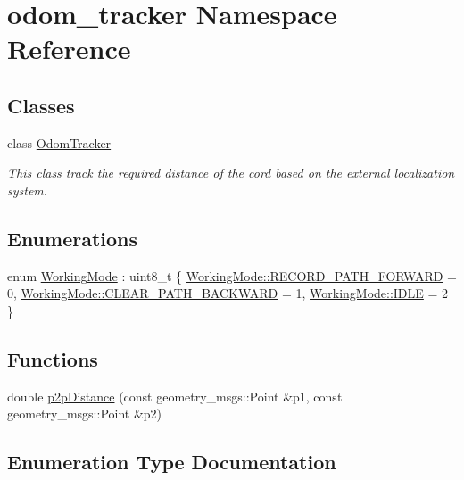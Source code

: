 \hypertarget{namespaceodom__tracker}{}\section{odom\+\_\+tracker Namespace Reference}
\label{namespaceodom__tracker}
\subsection*{Classes}
\begin{DoxyCompactItemize}
\item 
class \hyperlink{classodom__tracker_1_1OdomTracker}{Odom\+Tracker}
\begin{DoxyCompactList}\small\item\em This class track the required distance of the cord based on the external localization system. \end{DoxyCompactList}\end{DoxyCompactItemize}
\subsection*{Enumerations}
\begin{DoxyCompactItemize}
\item 
enum \hyperlink{namespaceodom__tracker_a4daf27fd157b1a481fdfd6f90de00b88}{Working\+Mode} \+: uint8\+\_\+t \{ \hyperlink{namespaceodom__tracker_a4daf27fd157b1a481fdfd6f90de00b88a989d06a586bcf9520889228da7faa643}{Working\+Mode\+::\+R\+E\+C\+O\+R\+D\+\_\+\+P\+A\+T\+H\+\_\+\+F\+O\+R\+W\+A\+RD} = 0, 
\hyperlink{namespaceodom__tracker_a4daf27fd157b1a481fdfd6f90de00b88a0cf8f27617189e35619df3c18bda6274}{Working\+Mode\+::\+C\+L\+E\+A\+R\+\_\+\+P\+A\+T\+H\+\_\+\+B\+A\+C\+K\+W\+A\+RD} = 1, 
\hyperlink{namespaceodom__tracker_a4daf27fd157b1a481fdfd6f90de00b88aa5daf7f2ebbba4975d61dab1c40188c7}{Working\+Mode\+::\+I\+D\+LE} = 2
 \}
\end{DoxyCompactItemize}
\subsection*{Functions}
\begin{DoxyCompactItemize}
\item 
double \hyperlink{namespaceodom__tracker_a18caccd20c7915e29706a95860e34cca}{p2p\+Distance} (const geometry\+\_\+msgs\+::\+Point \&p1, const geometry\+\_\+msgs\+::\+Point \&p2)
\end{DoxyCompactItemize}


\subsection{Enumeration Type Documentation}
